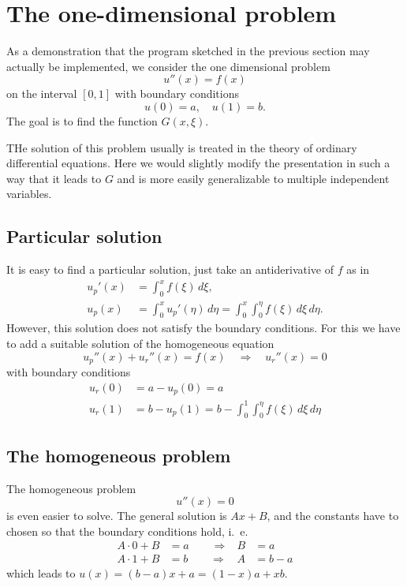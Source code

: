 %
%
%
\section{The one-dimensional problem}
As a demonstration that the program sketched in the previous section
may actually be implemented, we consider the one dimensional problem
\[
u''(x)=f(x)
\]
on the interval $[0,1]$ with boundary conditions
\[
u(0)=a,\quad u(1)=b.
\]
The goal is to find the function $G(x,\xi)$.

THe solution of this problem usually is treated in the theory of
ordinary differential equations.
Here we would slightly modify the presentation in such a way
that it leads to $G$ and is more easily generalizable to 
multiple independent variables.

\subsection{Particular solution}
It is easy to find a particular solution, just take an antiderivative
of $f$ as in
\begin{align*}
u_p'(x)&=\int_0^xf(\xi)\,d\xi,
\\
u_p(x)&=\int_0^xu_p'(\eta)\,d\eta=\int_0^x\int_0^\eta f(\xi)\,d\xi\,d\eta.
\end{align*}
However, this solution does not satisfy the boundary conditions.
For this we have to add a suitable solution of the homogeneous
equation
\[
u_p''(x) + u_r''(x)=f(x)\quad\Rightarrow\quad u_r''(x)=0
\]
with boundary conditions
\begin{align*}
u_r(0)&=a-u_p(0)=a\\
u_r(1)&=b-u_p(1)=b-\int_0^1\int_0^\eta f(\xi)\,d\xi\,d\eta
\end{align*}

\subsection{The homogeneous problem}
The homogeneous problem
\[
u''(x)=0
\]
is even easier to solve.
The general solution is $Ax+B$, and the constants have to chosen
so that the boundary conditions hold, i.~e.
\begin{align*}
A\cdot 0+B&=a\qquad\Rightarrow&B&=a\\
A\cdot 1+B&=b\qquad\Rightarrow&A&=b-a
\end{align*}
which leads to $u(x)=(b-a)x+a=(1-x)a+xb$.

